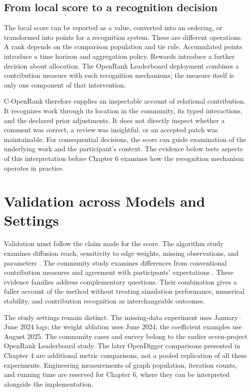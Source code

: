 \subsection{From local score to a recognition decision}
The local score can be reported as a value, converted into an ordering, or transformed into points for a recognition system. These are different operations. A rank depends on the comparison population and tie rule. Accumulated points introduce a time horizon and aggregation policy. Rewards introduce a further decision about allocation. The OpenRank Leaderboard deployment combines a contribution measure with such recognition mechanisms; the measure itself is only one component of that intervention.

C-OpenRank therefore supplies an inspectable account of relational contribution. It recognizes work through its location in the community, its typed interactions, and the declared prior adjustments. It does not directly inspect whether a comment was correct, a review was insightful, or an accepted patch was maintainable. For consequential decisions, the score can guide examination of the underlying work and the participant's context. The evidence below tests aspects of this interpretation before Chapter 6 examines how the recognition mechanism operates in practice.

\section{Validation across Models and Settings}
\label{sec:ch5-evidence}

Validation must follow the claim made for the score. The algorithm study examines diffusion reach, sensitivity to edge weights, missing observations, and parameters \citep{han2026rank}. The community study examines differences from conventional contribution measures and agreement with participants' expectations \citep{zhao2024}. These evidence families address complementary questions. Their combination gives a fuller account of the method without treating simulation performance, numerical stability, and contribution recognition as interchangeable outcomes.

The study settings remain distinct. The missing-data experiment uses January--June 2024 logs; the weight ablation uses June 2024; the coefficient examples use August 2025. The community cases and survey belong to the earlier seven-project OpenRank Leaderboard study. The later OpenDigger comparisons presented in Chapter 4 are additional metric comparisons, not a pooled replication of all these experiments. Engineering measurements of graph population, iteration counts, and running time are reserved for Chapter 6, where they can be interpreted alongside the implementation.

